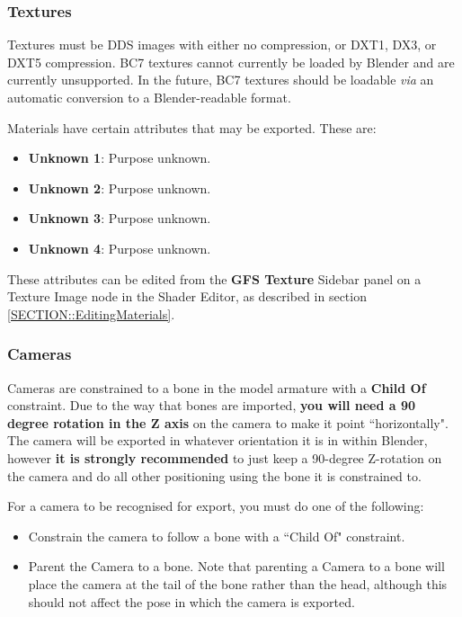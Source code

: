 \documentclass{article}
\begin{document}
\subsubsection{Textures}
Textures must be DDS images with either no compression, or DXT1, DX3, or DXT5 compression. BC7 textures cannot currently be loaded by Blender and are currently unsupported. In the future, BC7 textures should be loadable \textit{via} an automatic conversion to a Blender-readable format.

\noindent Materials have certain attributes that may be exported. These are:
\begin{itemize}
\item \textbf{Unknown 1}: Purpose unknown.
\item \textbf{Unknown 2}: Purpose unknown.
\item \textbf{Unknown 3}: Purpose unknown.
\item \textbf{Unknown 4}: Purpose unknown.
\end{itemize}
These attributes can be edited from the \textbf{GFS Texture} Sidebar panel on a Texture Image node in the Shader Editor, as described in section \ref{SECTION::EditingMaterials}.

\subsubsection{Cameras}
Cameras are constrained to a bone in the model armature with a \textbf{Child Of} constraint. Due to the way that bones are imported, \textbf{you will need a 90 degree rotation in the Z axis} on the camera to make it point ``horizontally". The camera will be exported in whatever orientation it is in within Blender, however \textbf{it is strongly recommended} to just keep a 90-degree Z-rotation on the camera and do all other positioning using the bone it is constrained to.

For a camera to be recognised for export, you must do one of the following:
\begin{itemize}
\item Constrain the camera to follow a bone with a ``Child Of" constraint.
\item Parent the Camera to a bone. Note that parenting a Camera to a bone will place the camera at the tail of the bone rather than the head, although this should not affect the pose in which the camera is exported.
\end{itemize}
\end{document}
